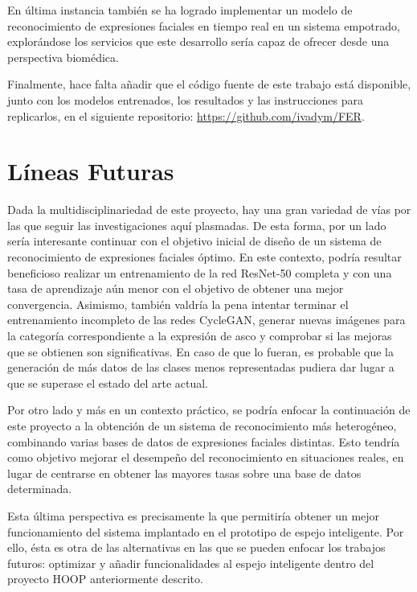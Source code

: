 En última instancia también se ha logrado implementar un modelo de reconocimiento de expresiones faciales en tiempo real en un sistema empotrado, explorándose los servicios que este desarrollo sería capaz de ofrecer desde una perspectiva biomédica.

Finalmente, hace falta añadir que el código fuente de este trabajo está disponible, junto con los modelos entrenados, los resultados y las instrucciones para replicarlos, en el siguiente repositorio: \url{https://github.com/ivadym/FER}.

\section{Líneas Futuras}

Dada la multidisciplinariedad de este proyecto, hay una gran variedad de vías por las que seguir las investigaciones aquí plasmadas. De esta forma, por un lado sería interesante continuar con el objetivo inicial de diseño de un sistema de reconocimiento de expresiones faciales óptimo. En este contexto, podría resultar beneficioso realizar un entrenamiento de la red ResNet-50 completa y con una tasa de aprendizaje aún menor con el objetivo de obtener una mejor convergencia. Asimismo, también valdría la pena intentar terminar el entrenamiento incompleto de las redes CycleGAN, generar nuevas imágenes para la categoría correspondiente a la expresión de asco y comprobar si las mejoras que se obtienen son significativas. En caso de que lo fueran, es probable que la generación de más datos de las clases menos representadas pudiera dar lugar a que se superase el estado del arte actual.

Por otro lado y más en un contexto práctico, se podría enfocar la continuación de este proyecto a la obtención de un sistema de reconocimiento más heterogéneo, combinando varias bases de datos de expresiones faciales distintas. Esto tendría como objetivo mejorar el desempeño del reconocimiento en situaciones reales, en lugar de centrarse en obtener las mayores tasas sobre una base de datos determinada.

Esta última perspectiva es precisamente la que permitiría obtener un mejor funcionamiento del sistema implantado en el prototipo de espejo inteligente. Por ello, ésta es otra de las alternativas en las que se pueden enfocar los trabajos futuros: optimizar y añadir funcionalidades al espejo inteligente dentro del proyecto HOOP anteriormente descrito.
